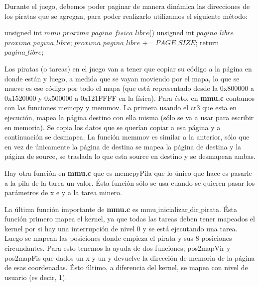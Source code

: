 Durante el juego, debemos poder paginar de manera din\'amica las direcciones de los piratas que se agregan, para poder realizarlo utilizamos el siguiente m\'etodo:
\begin{algorithmic}
    \State \tab unsigned int $mmu\_proxima\_pagina\_fisica\_libre$() {
  \State \tab \tab unsigned int $pagina\_libre$ = $proxima\_pagina\_libre$;
  \State \tab \tab $proxima\_pagina\_libre$ += $PAGE\_SIZE$;
  \State \tab \tab return $pagina\_libre$;
\State \tab }
\end{algorithmic}

Los piratas (o tareas) en el juego van a tener que copiar su código a la página en donde están y luego, a medida que se vayan moviendo por el mapa, lo que se mueve es ese código por todo el mapa (que está representado desde la 0x800000 a 0x1520000 y 0x500000 a 0x121FFFF en la física).
Para ésto, en \textbf{mmu.c} contamos con las funciones memcpy y memmov. La primera usando el cr3 que esta en ejecución, mapea la página destino con ella misma (sólo se va a usar para escribir en memoria). Se copia los datos que se querían copiar a esa página y a continuación se desmapea. 
La función memmov es similar a la anterior, sólo que en vez de únicamente la página de destina se mapea la página de destina y la página de source, se traslada lo que esta source en destino y se desmapean ambas.

Hay otra función en \textbf{mmu.c} que es memcpyPila que lo único que hace es pasarle a la pila de la tarea un valor. Ésta función sólo se usa cuando se quieren pasar los parámetros de x e y a la tarea minero.

La última función importante de \textbf{mmu.c} es mmu$\_$inicializar$\_$dir$\_$pirata.
\newline
Ésta función primero mapea el kernel, ya que todas las tareas deben tener mapeados el kernel por si hay una interrupción de nivel 0 y se está ejecutando una tarea. Luego se mapean las posiciones donde empieza el pirata y sus 8 posiciones circundantes. Para esto tenemos la ayuda de dos funciones; pos2mapVir y pos2mapFis que dados un x y un y devuelve la dirección de memoria de la página de esas coordenadas. Ésto último, a diferencia del kernel, se mapea con nivel de usuario (es decir, 1).
 


